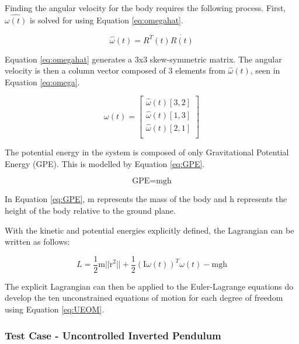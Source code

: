 Finding the angular velocity for the body requires the following process. First, $\hat{\omega(t)}$ is solved for using Equation \ref{eq:omegahat}.

\begin{equation}
\label{eq:omegahat}
\hat{\omega}(t)=R^T(t)\dot{R(t)}
\end{equation}

Equation \ref{eq:omegahat} generates a 3x3 skew-symmetric matrix. The angular velocity is then a column vector composed of 3 elements from $\hat{\omega}(t)$, seen in Equation \ref{eq:omega}.

\begin{equation}
\label{eq:omega}
\omega(t)=\begin{bmatrix}
\hat{\omega}(t)[3,2] \\
\hat{\omega}(t)[1,3] \\
\hat{\omega}(t)[2,1]\\
\end{bmatrix}
\end{equation}

The potential energy in the system is composed of only Gravitational Potential Energy (GPE). This is modelled by Equation \ref{eq:GPE}.

\begin{equation}
\label{eq:GPE}
\text{GPE} = {\text{m}}{\text{g}}{\text{h}}
\end{equation}

In Equation \ref{eq:GPE}, m represents the mass of the body and h represents the height of the body relative to the ground plane.

With the kinetic and potential energies explicitly defined, the Lagrangian can be written as follows:

\begin{equation}
L= \frac{1}{2}{\text{m}}{\lvert \lvert {\dot{\text{r}}^2} \rvert \rvert} + \frac{1}{2}({\text{I}}{\omega(t)})^T\omega(t) - {\text{m}}{\text{g}}{\text{h}}
\end{equation}

The explicit Lagrangian can then be applied to the Euler-Lagrange equations do develop the ten unconstrained equations of motion for each degree of freedom using Equation \ref{eq:UEOM}.

\subsubsection{Test Case - Uncontrolled Inverted Pendulum}\label{sec:testcaseip}

